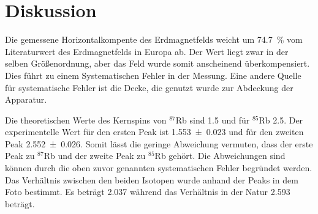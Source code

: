 \section{Diskussion}
\label{sec:Diskussion}

Die gemessene Horizontalkompente des Erdmagnetfelds weicht um \SI{74.7}{\percent} vom Literaturwert des Erdmagnetfelds in Europa ab.
Der Wert liegt zwar in der selben Größenordnung, aber das Feld wurde somit anscheinend überkompensiert. 
Dies führt zu einem Systematischen Fehler in der Messung. Eine andere Quelle für systematische Fehler ist die Decke, die genutzt wurde zur Abdeckung der Apparatur.

Die theoretischen Werte des Kernspins von $^{87}$Rb sind \num{1.5} und für $^{85}$Rb \num{2.5}.
Der experimentelle Wert für den ersten Peak ist \num{1.553(23)} und für den zweiten Peak \num{2.552(26)}. Somit lässt die geringe Abweichung vermuten, dass der erste Peak zu $^{87}$Rb und der zweite Peak zu $^{85}$Rb gehört. 
Die Abweichungen sind können durch die oben zuvor genannten systematischen Fehler begründet werden. 
Das Verhältnis zwischen den beiden Isotopen wurde anhand der Peaks in dem Foto bestimmt. 
Es beträgt \num{2.037} während das Verhältnis in der Natur \num{2.593} beträgt. 


